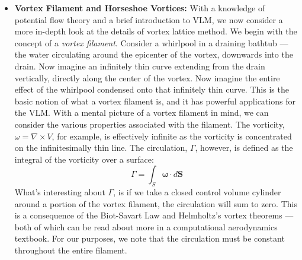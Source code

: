 \documentclass{report}
\begin{document}
\begin{itemize}
This is how the VLM theory works --- similar to the superposition of elementary flows in Figure~\ref{fig:superposition}, VLM uses series of superposed horseshoe vortices on the wing to model the air flow around the wing. 
\item[] \textbf{Vortex Filament and Horseshoe Vortices:} With a knowledge of potential flow theory and a brief introduction to VLM, we now consider a more in-depth look at the details of vortex lattice method. We begin with the concept of a \textit{vortex filament}.
Consider a whirlpool in a draining bathtub --- the water circulating around the epicenter of the vortex, downwards into the drain. Now imagine an infinitely thin curve 
extending from the drain vertically, directly along the center of the vortex. Now imagine the entire effect of the whirlpool condensed onto that infinitely thin curve. 
This is the basic notion of what a vortex filament is, and it has powerful applications for the VLM.\@
With a mental picture of a vortex filament in mind, we can consider the various properties associated with the filament.
The vorticity, $\omega = \nabla \times V$, for example, is effectively infinite as the vorticity is concentrated on the infinitesimally thin line.
The circulation, $\Gamma$, however, is defined as the integral of the vorticity over a surface:
\begin{equation}\label{eq:filament_Gamma}
\Gamma = \int_{S}^{}\boldsymbol{\omega}\cdot d\boldsymbol{S}
\end{equation}
What's interesting about $\Gamma$, is if we take a closed control volume cylinder around a portion of the vortex filament, the circulation will sum to zero. This is a consequence of the Biot-Savart Law and Helmholtz's vortex theorems --- both of which can be read about more in a computational aerodynamics textbook. 
For our purposes, we note that the circulation must be constant throughout the entire filament. 


\end{itemize}
\end{document}
